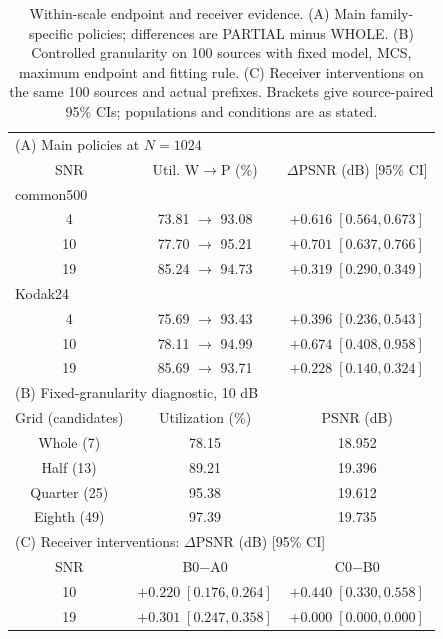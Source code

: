 \begin{table}[t]
\caption{Within-scale endpoint and receiver evidence. (A) Main family-specific policies; differences are PARTIAL minus WHOLE. (B) Controlled granularity on 100 sources with fixed model, MCS, maximum endpoint and fitting rule. (C) Receiver interventions on the same 100 sources and actual prefixes. Brackets give source-paired 95\% CIs; populations and conditions are as stated.}
\label{tab:internal}
\centering\footnotesize
\setlength{\tabcolsep}{2.5pt}
\begin{tabular}{ccc}
\toprule
\multicolumn{3}{l}{(A) Main policies at $N=1024$} \\
SNR & Util. W$\to$P (\%) & $\Delta$PSNR (dB) [95\% CI] \\
\midrule
\multicolumn{3}{l}{common500} \\
4 & 73.81 $\to$ 93.08 & $+0.616\;[0.564,0.673]$ \\
10 & 77.70 $\to$ 95.21 & $+0.701\;[0.637,0.766]$ \\
19 & 85.24 $\to$ 94.73 & $+0.319\;[0.290,0.349]$ \\
\multicolumn{3}{l}{Kodak24} \\
4 & 75.69 $\to$ 93.43 & $+0.396\;[0.236,0.543]$ \\
10 & 78.11 $\to$ 94.99 & $+0.674\;[0.408,0.958]$ \\
19 & 85.69 $\to$ 93.71 & $+0.228\;[0.140,0.324]$ \\
\midrule
\multicolumn{3}{l}{(B) Fixed-granularity diagnostic, 10 dB} \\
Grid (candidates) & Utilization (\%) & PSNR (dB) \\
Whole (7) & 78.15 & 18.952 \\
Half (13) & 89.21 & 19.396 \\
Quarter (25) & 95.38 & 19.612 \\
Eighth (49) & 97.39 & 19.735 \\
\midrule
\multicolumn{3}{l}{(C) Receiver interventions: $\Delta$PSNR (dB) [95\% CI]} \\
SNR & B0$-$A0 & C0$-$B0 \\
10 & $+0.220\;[0.176,0.264]$ & $+0.440\;[0.330,0.558]$ \\
19 & $+0.301\;[0.247,0.358]$ & $+0.000\;[0.000,0.000]$ \\
\bottomrule
\end{tabular}
\end{table}
